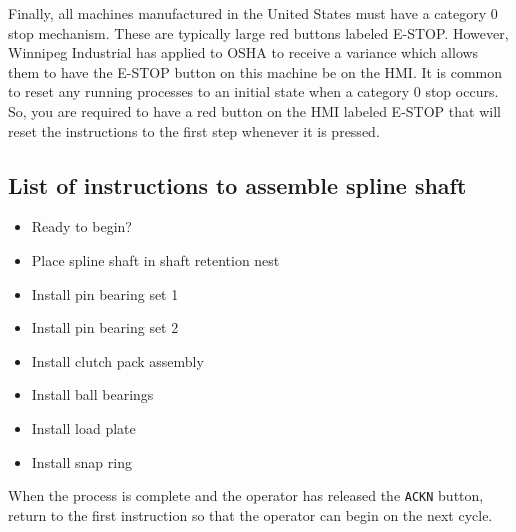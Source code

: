 Finally, all machines manufactured in the United States must have a category 0 stop mechanism. These are typically large red buttons labeled E-STOP. However, Winnipeg Industrial has applied to OSHA to receive a variance which allows them to have the E-STOP button on this machine be on the HMI. It is common to reset any running processes to an initial state when a category 0 stop occurs. So, you are required to have a red button on the HMI labeled E-STOP that will reset the instructions to the first step whenever it is pressed.


\subsection{List of instructions to assemble spline shaft}

\begin{itemize}
    \item Ready to begin?
    \item Place spline shaft in shaft retention nest
    \item Install pin bearing set 1
    \item Install pin bearing set 2
    \item Install clutch pack assembly
    \item Install ball bearings
    \item Install load plate
    \item Install snap ring
\end{itemize}

When the process is complete and the operator has released the \verb|ACKN| button, return to the first instruction so that the operator can begin on the next cycle.




